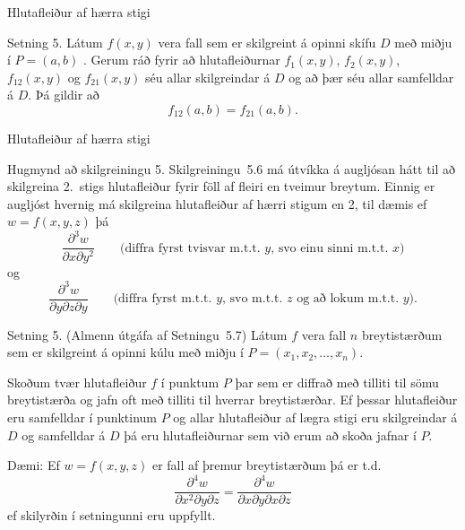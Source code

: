 \begin {frame}{Hlutafleiður af hærra stigi}
 \begin {block}{Setning 5.}
  Látum $f(x,y)$ vera fall sem er skilgreint á opinni
skífu $D$ með miðju í $P=(a,b)$ .  Gerum ráð fyrir að
hlutafleiðurnar $f_1(x,y)$, $f_2(x,y)$, $f_{12}(x,y)$ og $f_{21}(x,y)$
séu allar skilgreindar á $D$ og að þær séu allar samfelldar á $D$.  Þá
gildir að 
$$f_{12}(a,b)=f_{21}(a,b).$$
 \end {block}

\end {frame}

\begin {frame}{Hlutafleiður af hærra stigi}
 \begin {block}{Hugmynd að skilgreiningu 5.}
  Skilgreiningu~5.6 má útvíkka á augljósan hátt
til að skilgreina 2.~stigs hlutafleiður fyrir föll af fleiri en
tveimur breytum.   Einnig er augljóst hvernig má skilgreina
hlutafleiður af hærri stigum en 2, til dæmis ef $w=f(x,y,z)$ þá 
$$\frac{\partial^3 w}{\partial x\partial y^2} \quad\quad\mbox{(diffra
    fyrst tvisvar m.t.t. }y\mbox{, svo einu sinni m.t.t. } x\mbox{)}$$
og 
$$\frac{\partial^3 w}{\partial y\partial z\partial y} \quad\quad\mbox{(diffra
    fyrst m.t.t. } y\mbox{, svo m.t.t. } z
\mbox{ og að lokum m.t.t. }y\mbox{)}.$$

 \end {block}

\end {frame}

\begin {frame}
 \begin {block}{Setning 5. (Almenn útgáfa af Setningu~5.7)}
     Látum $f$ vera
fall $n$ breytistærðum sem er skilgreint á opinni kúlu með miðju í 
$P=(x_1, x_2,\ldots, x_n)$.  

\medskip
Skoðum tvær hlutafleiður $f$ í punktum $P$
þar sem er diffrað með tilliti til sömu breytistærða og jafn oft með
tilliti til hverrar breytistærðar.  Ef þessar hlutafleiður eru
samfelldar í punktinum $P$ og allar hlutafleiður af lægra stigi eru
skilgreindar á $D$ og samfelldar á $D$ þá eru hlutafleiðurnar sem við
erum að skoða jafnar í $P$.
 \end {block}
\pause
 \begin {block} {Dæmi:} 
 Ef $w = f(x,y,z)$ er fall af þremur breytistærðum þá er t.d.~
 \begin {equation*}
  \frac{\partial^4 w}{\partial x^2\partial y \partial z} = \frac{\partial^4 w}{\partial x \partial y \partial x \partial z}
 \end {equation*}
ef skilyrðin í setningunni eru uppfyllt.
  
 \end {block}

\end {frame}



